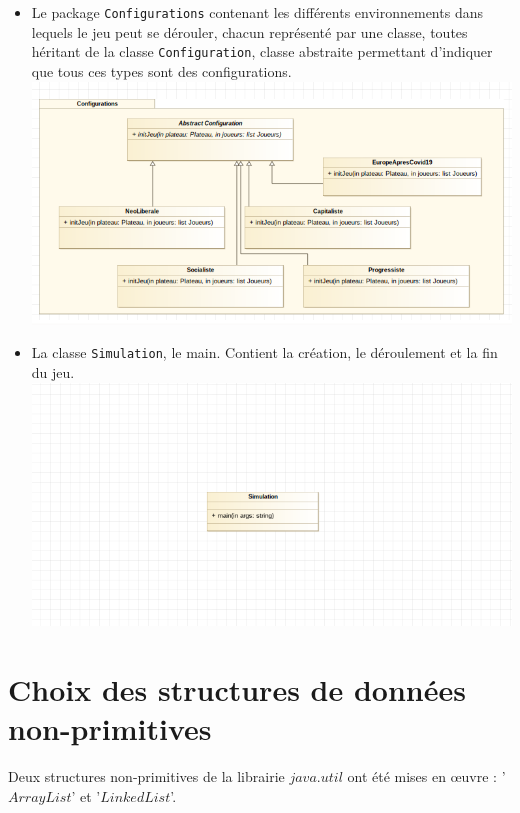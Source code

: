 \documentclass[11pt, a4paper]{report}
\begin{document}
\begin{itemize}
		\item Le package \verb|Configurations| contenant les différents environnements dans lequels le jeu peut se dérouler, chacun représenté par une classe, toutes héritant de la classe \verb|Configuration|, classe abstraite permettant d'indiquer que tous ces types sont des configurations.\\
		\includegraphics[width=1\textwidth]{images/Configurations2.png}
		
		\pagebreak
		
		\item La classe \verb|Simulation|, le main. Contient la création, le déroulement et la fin du jeu.\\
		\includegraphics[width=1\textwidth]{images/Simulation2.png}
		
	\end{itemize}
	
	
	\chapter{Choix des structures de données non-primitives}
	
	Deux structures non-primitives de la librairie $java.util$ ont été mises en œuvre : '$ArrayList$' et '$LinkedList$'.
	
\end{document}
